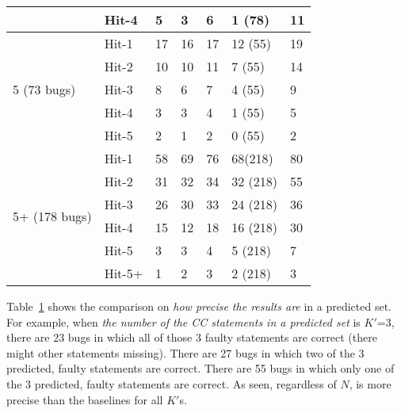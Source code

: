 \begin{table}[t]
{\begin{center}
\begin{tabular}{p{1.3cm}<{\centering}|p{0.8cm}<{\centering}|p{1cm}<{\centering}|p{0.8cm}<{\centering}|p{1.3cm}<{\centering}|p{1cm}<{\centering}|p{1.3cm}<{\centering}}
				& Hit-4       					    & 5 & 3 & 6 & 1 (78) & 11 \\
				\hline 
				\multirow{5}{*}{5 (73 bugs)}  & Hit-1    & 17 & 16 & 17 & 12 (55) & 19 \\
				& Hit-2       						  & 10 & 10 & 11 & 7 (55) &14 \\
				& Hit-3       						  & 8 & 6 & 7 & 4 (55) &9 \\
				& Hit-4         					  & 3 & 3 & 4 & 1 (55) &5 \\
				& Hit-5      						   & 2 & 1 & 2 & 0 (55) &2 \\
				\hline
				\multirow{6}{*}{5+ (178 bugs)}  & Hit-1 & 58 & 69 & 76 & 68(218)& 80 \\
				& Hit-2        				       & 31 & 32 & 34 & 32 (218) &55 \\
				& Hit-3       				       & 26 & 30 & 33 & 24 (218) &36 \\
				& Hit-4      				       & 15 & 12 & 18 & 16 (218)&30 \\
				& Hit-5      				       & 3  & 3 & 4 & 5 (218) &7 \\
				& Hit-5+       				       & 1  & 2 & 3 & 2 (218) & 3 \\
				\hline
			\end{tabular}
			\label{fig:rq1-prec}
		\end{center}
	}
\end{table}

Table~\ref{fig:rq1-prec} shows the comparison on {\em how precise the
results are} in a predicted set. For example, when {\em the number of the
CC statements in a predicted set} is $K'$=3, there are 23 bugs in which
all of those 3 faulty statements are correct (there might other
statements missing).  There are 27 bugs in which two of the 3
predicted, faulty statements are correct. There are 55 bugs in which
only one of the 3 predicted, faulty statements are correct. As seen,
regardless of $N$, {\tool} is more precise than the baselines for all
$K'$s.






